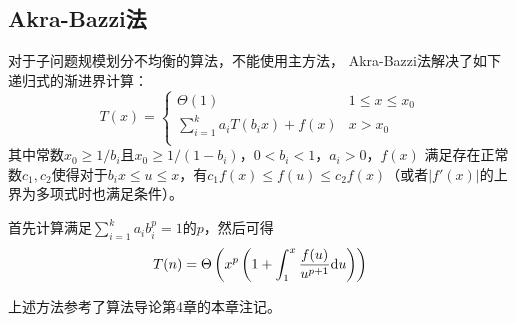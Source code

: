 \subsection{Akra-Bazzi法}
对于子问题规模划分不均衡的算法，不能使用主方法，
Akra-Bazzi法解决了如下递归式的渐进界计算：
\begin{displaymath}
	T(x)=\left\{\begin{array}{ll}
		\Theta(1)                     & 1\leq x \leq x_0 \\
		\sum_{i=1}^k{a_iT(b_ix)}+f(x) & x>x_0            \\
	\end{array}\right.
\end{displaymath}
其中常数$x_0\geq 1/b_i$且$x_0 \geq 1/(1-b_i)$，$0<b_i<1$，$a_i>0$，$f(x)$
满足存在正常数$c_1,c_2$使得对于$b_ix\leq u \leq x$，有$c_1f(x)\leq f(u)
	\leq c_2f(x)$（或者$|f'(x)|$的上界为多项式时也满足条件）。

首先计算满足$\sum_{i=1}^k{a_ib_i^p}=1$的$p$，然后可得
\begin{displaymath}
	T(n)=\Theta\left(x^p\left(1+\int_1^x{\frac{f(u)}{u^{p+1}} \mathrm{d} u}\right)\right)
\end{displaymath}

上述方法参考了算法导论\cite{ITA3}第4章的本章注记。
